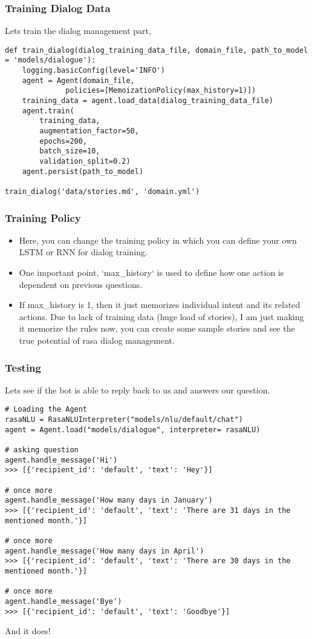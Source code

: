 \begin{frame}[fragile]\frametitle{Training Dialog Data}
Lets train the dialog management part,

\begin{lstlisting}
def train_dialog(dialog_training_data_file, domain_file, path_to_model = 'models/dialogue'):
    logging.basicConfig(level='INFO')
    agent = Agent(domain_file,
              policies=[MemoizationPolicy(max_history=1)])
    training_data = agent.load_data(dialog_training_data_file)
    agent.train(
        training_data,
        augmentation_factor=50,
        epochs=200,
        batch_size=10,
        validation_split=0.2)
    agent.persist(path_to_model)

train_dialog('data/stories.md', 'domain.yml')
\end{lstlisting}

\end{frame}


 \begin{frame}[fragile]\frametitle{Training Policy}

\begin{itemize}
\item Here, you can change the training policy in which you can define your own LSTM or RNN for dialog training. 
\item One important point, `max\_history` is used to define how one action is dependent on previous questions. 
\item If max\_history is 1, then it just memorizes individual intent and its related actions. Due to lack of training data (huge load of stories), I am just making it memorize the rules now, you can create some sample stories and see the true potential of rasa dialog management.
\end{itemize}
\end{frame}

 \begin{frame}[fragile]\frametitle{Testing}
Lets see if the bot is able to reply back to us and answers our question.

\begin{lstlisting}
# Loading the Agent
rasaNLU = RasaNLUInterpreter("models/nlu/default/chat")
agent = Agent.load("models/dialogue", interpreter= rasaNLU)

# asking question
agent.handle_message('Hi')
>>> [{'recipient_id': 'default', 'text': 'Hey'}]

# once more
agent.handle_message('How many days in January')
>>> [{'recipient_id': 'default', 'text': 'There are 31 days in the mentioned month.'}]

# once more
agent.handle_message('How many days in April')
>>> [{'recipient_id': 'default', 'text': 'There are 30 days in the mentioned month.'}]

# once more
agent.handle_message('Bye')
>>> [{'recipient_id': 'default', 'text': 'Goodbye'}]
\end{lstlisting}

And it does!
\end{frame}

